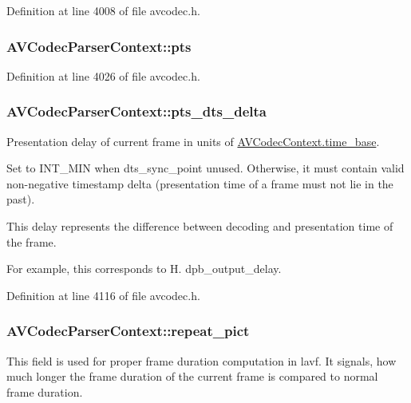 Definition at line 4008 of file avcodec.\+h.

\subsubsection[{\texorpdfstring{pts}{pts}}]{ A\+V\+Codec\+Parser\+Context\+::pts}\hypertarget{struct_a_v_codec_parser_context_a7e0b385e4ec6765ab0ae0db11565dd1d}{}\label{struct_a_v_codec_parser_context_a7e0b385e4ec6765ab0ae0db11565dd1d}


Definition at line 4026 of file avcodec.\+h.

\subsubsection[{\texorpdfstring{pts\+\_\+dts\+\_\+delta}{pts_dts_delta}}]{ A\+V\+Codec\+Parser\+Context\+::pts\+\_\+dts\+\_\+delta}\hypertarget{struct_a_v_codec_parser_context_a9d513dbc8c575da415f73a7e57db250a}{}\label{struct_a_v_codec_parser_context_a9d513dbc8c575da415f73a7e57db250a}
Presentation delay of current frame in units of \hyperlink{struct_a_v_codec_context_ab7bfeb9fa5840aac090e2b0bd0ef7589}{A\+V\+Codec\+Context.\+time\+\_\+base}.

Set to I\+N\+T\+\_\+\+M\+IN when dts\+\_\+sync\+\_\+point unused. Otherwise, it must contain valid non-\/negative timestamp delta (presentation time of a frame must not lie in the past).

This delay represents the difference between decoding and presentation time of the frame.

For example, this corresponds to H. dpb\+\_\+output\+\_\+delay. 

Definition at line 4116 of file avcodec.\+h.

\subsubsection[{\texorpdfstring{repeat\+\_\+pict}{repeat_pict}}]{ A\+V\+Codec\+Parser\+Context\+::repeat\+\_\+pict}\hypertarget{struct_a_v_codec_parser_context_a813780022f0a6abd1b7ab075264ffc3f}{}\label{struct_a_v_codec_parser_context_a813780022f0a6abd1b7ab075264ffc3f}
This field is used for proper frame duration computation in lavf. It signals, how much longer the frame duration of the current frame is compared to normal frame duration.


